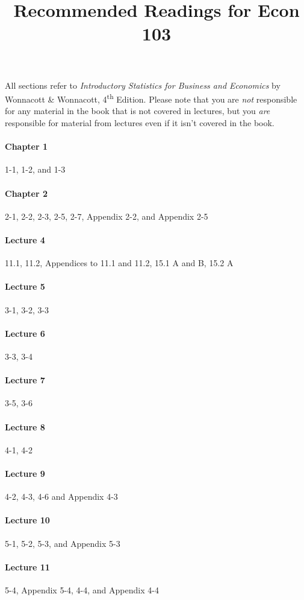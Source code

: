 \documentclass[12pt]{article}
\title{Recommended Readings for Econ 103}
\author{}
\date{}
\begin{document}
\maketitle

\noindent All sections refer to \emph{Introductory Statistics for Business and Economics} by Wonnacott \& Wonnacott, 4\textsuperscript{th} Edition.
Please note that you are \emph{not} responsible for any material in the book that is not covered in lectures, but you \emph{are} responsible for material from lectures even if it isn't covered in the book.

\paragraph{Chapter 1} 1-1, 1-2, and 1-3
\paragraph{Chapter 2} 2-1, 2-2, 2-3, 2-5, 2-7, Appendix 2-2, and Appendix 2-5
\paragraph{Lecture 4} 11.1, 11.2, Appendices to 11.1 and 11.2, 15.1 A and B, 15.2 A
\paragraph{Lecture 5} 3-1, 3-2, 3-3
\paragraph{Lecture 6} 3-3, 3-4
\paragraph{Lecture 7} 3-5, 3-6 
\paragraph{Lecture 8} 4-1, 4-2
\paragraph{Lecture 9} 4-2, 4-3, 4-6 and Appendix 4-3
\paragraph{Lecture 10} 5-1, 5-2, 5-3, and Appendix 5-3
\paragraph{Lecture 11} 5-4, Appendix 5-4, 4-4, and Appendix 4-4
\end{document}
